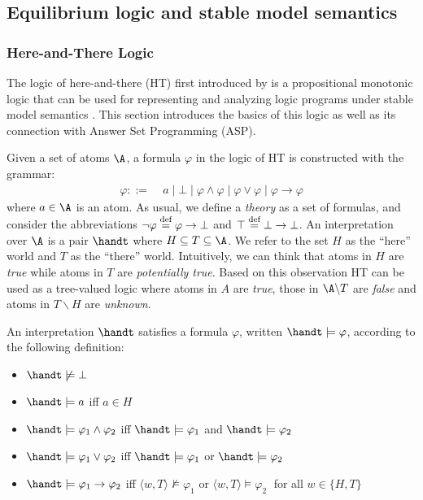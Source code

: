 \subsection{Equilibrium logic and stable model semantics  }

\subsubsection{Here-and-There Logic}

The logic of here-and-there (HT) first introduced by \cite{heyting30a} is a propositional monotonic logic that can be used for representing and analyzing logic programs under stable model semantics \cite{pearce96a,ferlif05a}. This section introduces the basics of this logic as well as its connection with Answer Set Programming (ASP).


Given a set of atoms $\A$, a formula $\varphi$ in the logic of HT is constructed with the grammar:
\begin{align*}
    \varphi ::= &\; a \mid \bot \mid
        \varphi \wedge \varphi \mid 
        \varphi \vee \varphi \mid
        \varphi \to \varphi 
\end{align*}
where $a\in \A$ is an atom.
As usual, we define a \emph{theory} as a set of formulas, and consider the abbreviations $\neg \varphi \stackrel{\text{def}}{=} \varphi \to \bot$ and $\top \stackrel{\text{def}}{=} \bot \to \bot$.
An interpretation over $\A$ is a pair $\handt$ where $H\subseteq T \subseteq \A$. We refer to the set $H$ as the ``here'' world and $T$ as the ``there'' world.
Intuitively, we can think that atoms in $H$ are \emph{true} while atoms in $T$ are \emph{potentially true}.
Based on this observation HT can be used as a tree-valued logic where atoms in $A$ are \emph{true}, those in $\A \backslash T$ are \emph{false} and atoms in $T \backslash H$ are \emph{unknown}. 

\begin{definition}[Semantics]
    An interpretation $\handt$ satisfies a formula $\varphi$, written $\handt \models \varphi$, according to the following definition:
    \begin{itemize}
        \item $\handt \not \models \bot$
        \item $\handt \models a$ iff $a\in H$
        \item $\handt \models \varphi_1 \wedge \varphi_2$ iff $\handt \models \varphi_1$ and  $\handt \models \varphi_2$
        \item $\handt \models \varphi_1 \vee \varphi_2$ iff $\handt \models \varphi_1$ or  $\handt \models \varphi_2$
        \item $\handt \models \varphi_1 \to \varphi_2$ iff $\langle w,T \rangle \not \models \varphi_1$ or  $\langle w,T \rangle \models \varphi_2\;$ for all 
        $w \in \{H,T\}$
    \end{itemize}
\end{definition}

